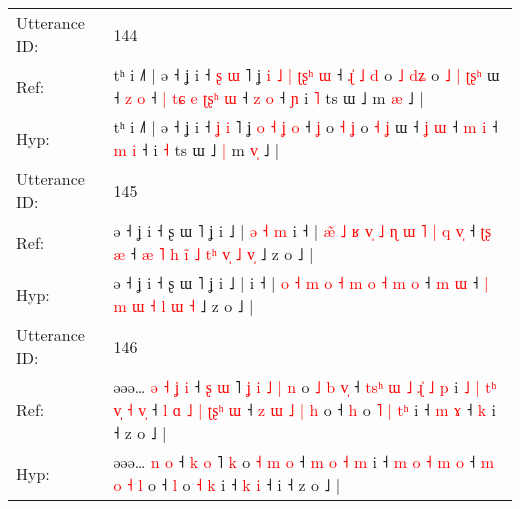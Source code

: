 \documentclass[10pt]{article}
\DeclareRobustCommand{\hl}[1]{{\textcolor{red}{#1}}}
\begin{document}
\begin{longtable}{ll}
\midrule
Utterance ID: & 144 \\
Ref: & tʰ i ˩˥ | ə ˧ ʝ i ˧ \hl{ʂ} \hl{ɯ} ˥ ʝ\hl{ }\hl{i} \hl{˩} \hl{|} \hl{ʈ}\hl{ʂ}\hl{ʰ} \hl{ɯ} ˧\hl{ }\hl{ɻ}\hl{̍}\hl{ }\hl{˩} \hl{d} o \hl{˩} \hl{d}\hl{ʑ} o\hl{ }\hl{˩} \hl{|} \hl{ʈ}\hl{ʂ}\hl{ʰ} ɯ ˧ \hl{z} \hl{o} ˧\hl{ }\hl{|}\hl{ }\hl{t}\hl{ɕ}\hl{ }\hl{e} \hl{ʈ}\hl{ʂ}\hl{ʰ} \hl{ɯ} ˧ \hl{z} \hl{o} ˧\hl{ }\hl{ɲ} i \hl{˥} ts ɯ ˩\hl{}\hl{} m \hl{}\hl{æ} ˩ |
 \\
Hyp: & tʰ i ˩˥ | ə ˧ ʝ i ˧ \hl{ʝ} \hl{i} ˥ ʝ\hl{}\hl{} \hl{o} \hl{˧} \hl{}\hl{}\hl{ʝ} \hl{o} ˧\hl{}\hl{}\hl{}\hl{}\hl{} \hl{ʝ} o \hl{˧} \hl{}\hl{ʝ} o\hl{}\hl{} \hl{˧} \hl{}\hl{}\hl{ʝ} ɯ ˧ \hl{ʝ} \hl{ɯ} ˧\hl{}\hl{}\hl{}\hl{}\hl{}\hl{}\hl{} \hl{}\hl{}\hl{m} \hl{i} ˧ \hl{m} \hl{i} ˧\hl{}\hl{} i \hl{˧} ts ɯ ˩\hl{ }\hl{|} m \hl{v}\hl{̩} ˩ |
 \\
\midrule
Utterance ID: & 145 \\
Ref: & ə ˧ ʝ i ˧ ʂ ɯ ˥ ʝ i ˩ |\hl{ }\hl{ə}\hl{ }\hl{˧}\hl{ }\hl{m} i ˧ |\hl{ }\hl{æ}\hl{̃} \hl{˩} \hl{ʁ} \hl{v}\hl{̩} \hl{˩} \hl{ɳ} \hl{ɯ} \hl{˥} \hl{|} \hl{q} \hl{v}\hl{̩} ˧ \hl{ʈ}\hl{ʂ} \hl{æ} ˧\hl{ }\hl{æ}\hl{ }\hl{˥} \hl{h} \hl{i}\hl{̃} \hl{˩} \hl{t}\hl{ʰ} \hl{v}\hl{̩} \hl{˩} \hl{v}\hl{̩} ˩ z o ˩ |
 \\
Hyp: & ə ˧ ʝ i ˧ ʂ ɯ ˥ ʝ i ˩ |\hl{}\hl{}\hl{}\hl{}\hl{}\hl{} i ˧ |\hl{}\hl{}\hl{} \hl{o} \hl{˧} \hl{}\hl{m} \hl{o} \hl{˧} \hl{m} \hl{o} \hl{˧} \hl{m} \hl{}\hl{o} ˧ \hl{}\hl{m} \hl{ɯ} ˧\hl{}\hl{}\hl{}\hl{} \hl{|} \hl{}\hl{m} \hl{ɯ} \hl{}\hl{˧} \hl{}\hl{l} \hl{ɯ} \hl{}\hl{˧} ˩ z o ˩ |
 \\
\midrule
Utterance ID: & 146 \\
Ref: & əəə…\hl{ }\hl{ə}\hl{ }\hl{˧} \hl{ʝ} \hl{i} ˧ \hl{ʂ} \hl{ɯ} ˥\hl{ }\hl{ʝ}\hl{ }\hl{i}\hl{ }\hl{˩}\hl{ }\hl{|} \hl{n} o \hl{˩} \hl{b} \hl{v}\hl{̩} ˧\hl{ }\hl{t}\hl{s}\hl{ʰ}\hl{ }\hl{ɯ} \hl{˩} \hl{ɻ}\hl{̍} \hl{˩} \hl{p} i\hl{ }\hl{˩}\hl{ }\hl{|}\hl{ }\hl{t}\hl{ʰ}\hl{ }\hl{v}\hl{̩}\hl{ }\hl{˧}\hl{ }\hl{v}\hl{̩} ˧\hl{ }\hl{l} \hl{ɑ} \hl{˩} \hl{|} \hl{ʈ}\hl{ʂ}\hl{ʰ} \hl{ɯ} ˧\hl{ }\hl{z} \hl{ɯ} \hl{˩} \hl{|} \hl{h} o ˧ \hl{h} o\hl{ }\hl{˥} \hl{|} \hl{t}\hl{ʰ} i ˧ \hl{m} \hl{ɤ} ˧\hl{ }\hl{k} i ˧ z o ˩ |
 \\
Hyp: & əəə…\hl{}\hl{}\hl{}\hl{} \hl{n} \hl{o} ˧ \hl{k} \hl{o} ˥\hl{}\hl{}\hl{}\hl{}\hl{}\hl{}\hl{}\hl{} \hl{k} o \hl{˧} \hl{m} \hl{}\hl{o} ˧\hl{}\hl{}\hl{}\hl{}\hl{}\hl{} \hl{m} \hl{}\hl{o} \hl{˧} \hl{m} i\hl{}\hl{}\hl{}\hl{}\hl{}\hl{}\hl{}\hl{}\hl{}\hl{}\hl{}\hl{}\hl{}\hl{}\hl{} ˧\hl{}\hl{} \hl{m} \hl{o} \hl{˧} \hl{}\hl{}\hl{m} \hl{o} ˧\hl{}\hl{} \hl{m} \hl{o} \hl{˧} \hl{l} o ˧ \hl{l} o\hl{}\hl{} \hl{˧} \hl{}\hl{k} i ˧ \hl{k} \hl{i} ˧\hl{}\hl{} i ˧ z o ˩ |

\end{longtable}
\end{document}

